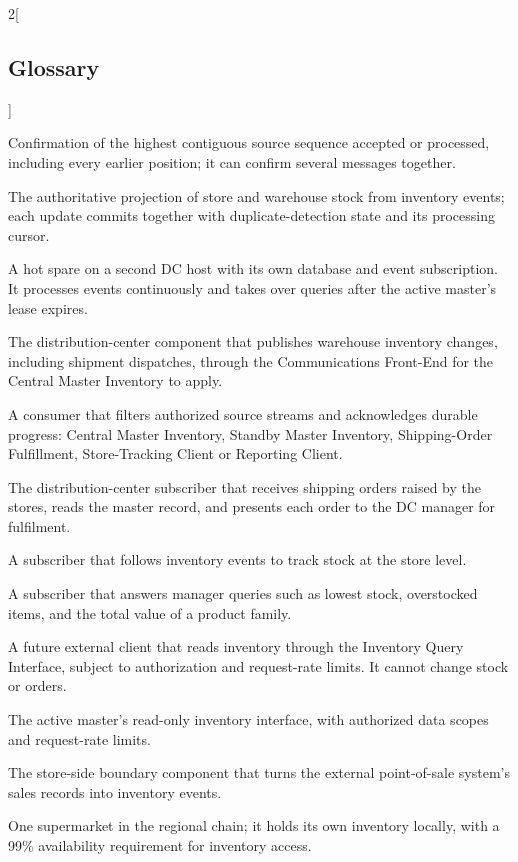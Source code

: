 \begin{multicols}{2}[\subsection{Glossary}\label{sec:glossary}]
\begin{description}[style=unboxed,leftmargin=1em,labelindent=0pt,itemsep=0.5pt,parsep=0pt]
\item[Cumulative acknowledgement] Confirmation of the highest contiguous source sequence accepted or processed, including every earlier position; it can confirm several messages together.
\item[Central Master Inventory] The authoritative projection of store and warehouse stock from inventory events; each update commits together with duplicate-detection state and its processing cursor.
\item[Standby Master Inventory] A hot spare on a second DC host with its own database and event subscription. It processes events continuously and takes over queries after the active master's lease expires.
\item[DC Agent] The distribution-center component that publishes warehouse inventory changes, including shipment dispatches, through the Communications Front-End for the Central Master Inventory to apply.
\item[Subscriber] A consumer that filters authorized source streams and acknowledges durable progress: Central Master Inventory, Standby Master Inventory, Shipping-Order Fulfillment, Store-Tracking Client or Reporting Client.
\item[Shipping-Order Fulfillment] The distribution-center subscriber that receives shipping orders raised by the stores, reads the master record, and presents each order to the DC manager for fulfilment.
\item[Store-Tracking Client] A subscriber that follows inventory events to track stock at the store level.
\item[Reporting Client] A subscriber that answers manager queries such as lowest stock, overstocked items, and the total value of a product family.
\item[External Analytics Client] A future external client that reads inventory through the Inventory Query Interface, subject to authorization and request-rate limits. It cannot change stock or orders.
\begin{samepage}
\item[Inventory Query Interface] The active master's read-only inventory interface, with authorized data scopes and request-rate limits.\par
\end{samepage}
\item[POS Adapter] The store-side boundary component that turns the external point-of-sale system's sales records into inventory events.
\item[Store] One supermarket in the regional chain; it holds its own inventory locally, with a 99\% availability requirement for inventory access.

\end{description}
\end{multicols}
